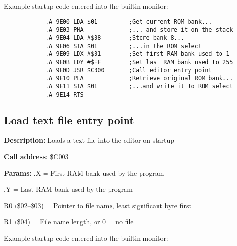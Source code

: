 \documentclass{article}
\begin{document}
        \vspace{1em}Example startup code entered into the builtin monitor:

        \begin{verbatim}
            .A 9E00 LDA $01         ;Get current ROM bank...
            .A 9E03 PHA             ;... and store it on the stack
            .A 9E04 LDA #$08        ;Store bank 8...
            .A 9E06 STA $01         ;...in the ROM select
            .A 9E09 LDX #$01        ;Set first RAM bank used to 1
            .A 9E0B LDY #$FF        ;Set last RAM bank used to 255
            .A 9E0D JSR $C000       ;Call editor entry point
            .A 9E10 PLA             ;Retrieve original ROM bank...
            .A 9E11 STA $01         ;...and write it to ROM select
            .A 9E14 RTS
        \end{verbatim}

    \subsection{Load text file entry point}

        \begin{hangparas}{3cm}{1}

            \textbf{Description:} \tabto{3cm} Loads a text file into the editor on startup

            \textbf{Call address:} \tabto{3cm}\$C003

            \textbf{Params:} \tabto{3cm}.X = First RAM bank used by the program
        
            \tabto{3cm} .Y = Last RAM bank used by the program

            \tabto{3cm} R0 (\$02--\$03) = Pointer to file name, least significant byte first

            \tabto{3cm} R1 (\$04) = File name length, or 0 = no file

        \end{hangparas}

        \vspace{1em}Example startup code entered into the builtin monitor:
\end{document}
